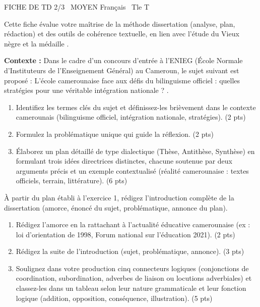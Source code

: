 \documentclass[11pt]{article}
\begin{document}
\begin{tcolorbox}[enhanced,colback=popink,colframe=popink,arc=10pt,boxrule=0pt,left=12pt,right=12pt,top=9pt,bottom=9pt]
{\color{white}\popxbold\small FICHE DE TD 2/3 \textbullet\ MOYEN \hfill Français \textbullet\ Tle T\par}
\end{tcolorbox}
\vspace{4pt}
\noindent Cette fiche évalue votre maîtrise de la méthode dissertation (analyse, plan, rédaction) et des outils de cohérence textuelle, en lien avec l'étude du \og Vieux nègre et la médaille \fg{}.

\begin{exercice}
\textbf{Contexte :} Dans le cadre d'un concours d'entrée à l'ENIEG (École Normale d'Instituteurs de l'Enseignement Général) au Cameroun, le sujet suivant est proposé : \og L'école camerounaise face aux défis du bilinguisme officiel : quelles stratégies pour une véritable intégration nationale ? \fg{}.
\begin{enumerate}
    \item Identifiez les termes clés du sujet et définissez-les brièvement dans le contexte camerounais (bilinguisme officiel, intégration nationale, stratégies). (2 pts)
    \item Formulez la problématique unique qui guide la réflexion. (2 pts)
    \item Élaborez un plan détaillé de type dialectique (Thèse, Antithèse, Synthèse) en formulant trois idées directrices distinctes, chacune soutenue par deux arguments précis et un exemple contextualisé (réalité camerounaise : textes officiels, terrain, littérature). (6 pts)
\end{enumerate}
\end{exercice}

\begin{exercice}
À partir du plan établi à l'exercice 1, rédigez l'introduction complète de la dissertation (amorce, énoncé du sujet, problématique, annonce du plan).
\begin{enumerate}
    \item Rédigez l'amorce en la rattachant à l'actualité éducative camerounaise (ex : loi d'orientation de 1998, Forum national sur l'éducation 2021). (2 pts)
    \item Rédigez la suite de l'introduction (sujet, problématique, annonce). (3 pts)
    \item Soulignez dans votre production cinq connecteurs logiques (conjonctions de coordination, subordination, adverbes de liaison ou locutions adverbiales) et classez-les dans un tableau selon leur nature grammaticale et leur fonction logique (addition, opposition, conséquence, illustration). (5 pts)
\end{enumerate}
\end{exercice}
\end{document}
